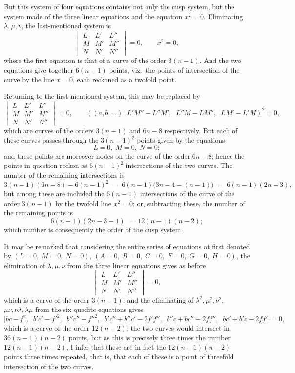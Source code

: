 \documentclass[11pt,a4paper]{article}
\providecommand{\mid}{\,|\,}
\begin{document}
\medskip

But this system of four equations contains not only the cusp system, but the system made of the three linear equations and the equation $x^2 = 0$. Eliminating $\lambda, \mu, \nu$, the last-mentioned system is
\[
\begin{vmatrix} L & L' & L'' \\ M & M' & M'' \\ N & N' & N''\end{vmatrix} = 0,\qquad x^2 = 0,
\]
where the first equation is that of a curve of the order $3(n - 1)$. And the two equations give together $6(n - 1)$ points, viz.\ the points of intersection of the curve by the line $x = 0$, each reckoned as a twofold point.

\medskip

Returning to the first-mentioned system, this may be replaced by
\[
\begin{vmatrix} L & L' & L'' \\ M & M' & M'' \\ N & N' & N''\end{vmatrix} = 0,\qquad ((a, b, \ldots)\mid L'M'' - L''M',\;\; L''M - LM'',\;\; LM' - L'M)^2 = 0,
\]
which are curves of the orders $3(n - 1)$ and $6n - 8$ respectively. But each of these curves passes through the $3(n - 1)^2$ points given by the equations
\[
L = 0,\;M = 0,\;N = 0;
\]
and these points are moreover nodes on the curve of the order $6n - 8$; hence the points in question reckon as $6(n - 1)^2$ intersections of the two curves. The number of the remaining intersections is
\[
3(n - 1)(6n - 8) - 6(n - 1)^2 \;=\; 6(n - 1)\bigl(3n - 4 - (n - 1)\bigr) \;=\; 6(n - 1)(2n - 3),
\]
but among these are included the $6(n - 1)$ intersections of the curve of the order $3(n - 1)$ by the twofold line $x^2 = 0$; or, subtracting these, the number of the remaining points is
\[
6(n - 1)(2n - 3 - 1) \;=\; 12(n - 1)(n - 2);
\]
which number is consequently the order of the cusp system.

\medskip

It may be remarked that considering the entire series of equations at first denoted by $(L = 0,\;M = 0,\;N = 0)$, $(A = 0,\;B = 0,\;C = 0,\;F = 0,\;G = 0,\;H = 0)$, the elimination of $\lambda, \mu, \nu$ from the three linear equations gives as before
\[
\begin{vmatrix} L & L' & L'' \\ M & M' & M'' \\ N & N' & N'' \end{vmatrix} = 0,
\]
which is a curve of the order $3(n - 1)$: and the eliminating of $\lambda^2, \mu^2, \nu^2$, $\mu\nu, \nu\lambda, \lambda\mu$ from the six quadric equations gives
\[
\bigl|bc - f^2,\;\; b'c' - f'^2,\;\; b''c'' - f''^2,\;\; b'c'' + b''c' - 2f'f'',\;\; b''c + bc'' - 2ff'',\;\; bc' + b'c - 2ff'\bigr| = 0,
\]
which is a curve of the order $12(n - 2)$; the two curves would intersect in $36(n - 1)(n - 2)$ points, but as this is precisely three times the number $12(n - 1)(n - 2)$, I infer that these are in fact the $12(n - 1)(n - 2)$ points three times repeated, that is, that each of these is a point of threefold intersection of the two curves.
\end{document}
